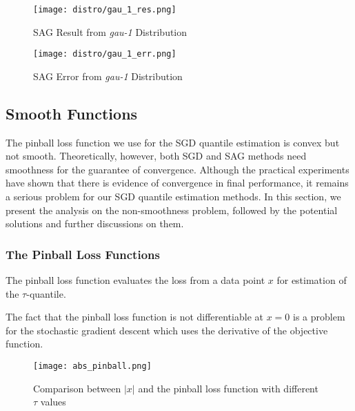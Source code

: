 \begin{figure}[H]
    \centering
	\texttt{[image: distro/gau\_1\_res.png]}
    \caption{SAG Result from \textit{gau-1} Distribution}
    \label{fig: sag_res}
\end{figure}

\begin{figure}[H]
    \centering
	\texttt{[image: distro/gau\_1\_err.png]}
    \caption{SAG Error from \textit{gau-1} Distribution}
    \label{fig: sag_err}

\end{figure}


\subsection{Smooth Functions}
\label{subsec: smooth_func}
The pinball loss function we use for the SGD quantile estimation is convex but not smooth. 
Theoretically, however, both SGD and SAG methods need smoothness for the guarantee of convergence. Although the practical experiments have shown that there is evidence of convergence in final performance, it remains a serious problem for our SGD quantile estimation methods. In this section, we present the analysis on the non-smoothness problem, followed by the potential solutions and further discussions on them.

\subsubsection{The Pinball Loss Functions}
\graphicspath{{Figures/Stepsize_adapt/Smooth_func/}{./}} 

The pinball loss function evaluates the loss from a data point $x$ for estimation of the $\tau$-quantile.


The fact that the pinball loss function is not differentiable at $x= 0$ is a problem for the stochastic gradient descent which uses the derivative of the objective function.

\begin{figure*}[h!]
	\texttt{[image: abs\_pinball.png]}
	\caption{Comparison between $|x|$ and the pinball loss function with different $\tau$ values}
\end{figure*}

